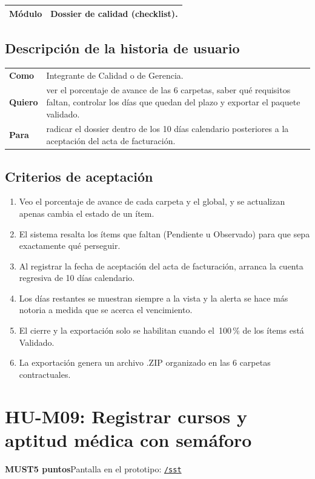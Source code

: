 \documentclass[11pt]{article}
\newcommand{\urlapp}{https://thankstochatgpt.github.io/LOARD}
\newcommand{\app}[1]{\href{\urlapp#1}{\texttt{#1}}}
\newcommand{\etiqueta}[1]{\colorbox{barra}{\textbf{\color{marca}#1}}}
\begin{document}
\begin{tabular}{>{\bfseries}p{2.4cm} p{13.4cm}}
\toprule
Módulo & Dossier de calidad (checklist). \\
\bottomrule
\end{tabular}

\subsection*{Descripción de la historia de usuario}

\begin{tabular}{>{\bfseries}p{2.4cm} p{13.4cm}}
\toprule
Como & Integrante de Calidad o de Gerencia. \\
Quiero & ver el porcentaje de avance de las 6 carpetas, saber qué requisitos faltan, controlar los días que quedan del plazo y exportar el paquete validado. \\
Para & radicar el dossier dentro de los 10 días calendario posteriores a la aceptación del acta de facturación. \\
\bottomrule
\end{tabular}

\subsection*{Criterios de aceptación}

\begin{enumerate}
\item Veo el porcentaje de avance de cada carpeta y el global, y se actualizan apenas cambia el estado de un ítem.
\item El sistema resalta los ítems que faltan (Pendiente u Observado) para que sepa exactamente qué perseguir.
\item Al registrar la fecha de aceptación del acta de facturación, arranca la cuenta regresiva de 10 días calendario.
\item Los días restantes se muestran siempre a la vista y la alerta se hace más notoria a medida que se acerca el vencimiento.
\item El cierre y la exportación solo se habilitan cuando el~100\,\% de los ítems está Validado.
\item La exportación genera un archivo .ZIP organizado en las 6 carpetas contractuales.
\end{enumerate}


\newpage
\section*{HU-M09: Registrar cursos y aptitud médica con semáforo}
\etiqueta{MUST}\quad\etiqueta{5 puntos}\quad Pantalla en el prototipo: \app{/sst}
\end{document}
